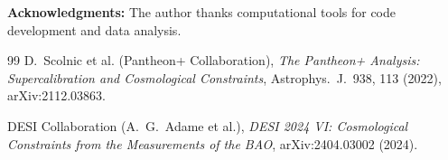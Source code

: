 \documentclass[10pt,a4paper,twocolumn]{article}
\begin{document}
\vspace{1em}
\textbf{Acknowledgments:} The author thanks computational tools for code development and data analysis.


\begin{thebibliography}{99}
D.~Scolnic et al. (Pantheon+ Collaboration),
\emph{The Pantheon+ Analysis: Supercalibration and Cosmological Constraints},
Astrophys.~J.~938, 113 (2022), arXiv:2112.03863.

DESI Collaboration (A.~G.~Adame et al.),
\emph{DESI 2024 VI: Cosmological Constraints from the Measurements of the BAO},
arXiv:2404.03002 (2024).
\end{thebibliography}
\end{document}
